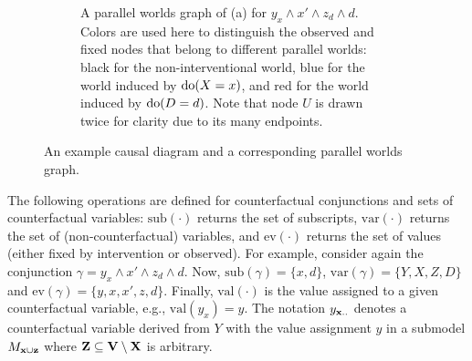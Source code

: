 \begin{figure}[ht]
\begin{subfigure}[t]{0.70\textwidth}
\begin{center}
  \end{center}
  \caption{A parallel worlds graph of (a) for \(y_x \wedge x' \wedge z_d \wedge d\). Colors are used here to distinguish the observed and fixed nodes that belong to different parallel worlds: black for the non-interventional world, blue for the world induced by \(\textrm{do}(X = x)\), and red for the world induced by \(\textrm{do}(D = d)\). Note that node \(U\) is drawn twice for clarity due to its many endpoints.}
  \label{fig:parrallelexampleworlds}
\end{subfigure}
\caption{An example causal diagram and a corresponding parallel worlds graph.}
\label{fig:parallelexample}
\end{figure}

The following operations are defined for counterfactual conjunctions and sets of counterfactual variables: \(\mathrm{sub}(\cdot)\) returns the set of subscripts, \(\mathrm{var}(\cdot)\) returns the set of (non-counterfactual) variables, and \(\mathrm{ev}(\cdot)\) returns the set of values (either fixed by intervention or observed). For example, consider again the conjunction \(\gamma = y_x \wedge x' \wedge z_d \wedge d\). Now, \(\mathrm{sub}(\gamma) = \{x,d\}\), \(\mathrm{var}(\gamma) = \{Y, X, Z, D\}\) and \(\mathrm{ev}(\gamma) = \{y, x, x',z,d\}\). Finally, \(\mathrm{val}(\cdot)\) is the value assigned to a given counterfactual variable, e.g., \(\mathrm{val}(y_x) = y\). The notation \(y_{\mathbf{x}..}\) denotes a counterfactual variable derived from \(Y\) with the value assignment \(y\) in a submodel \(M_{\mathbf{x} \cup \mathbf{z}}\) where \(\mathbf{Z} \subseteq \mathbf{V} \setminus \mathbf{X}\) is arbitrary.

